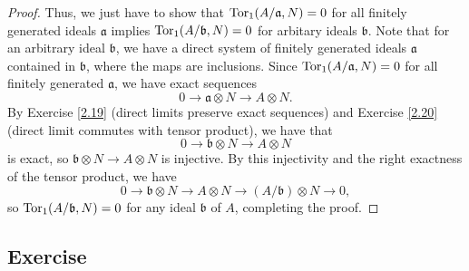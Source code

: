 \begin{proof}
Thus, we just have to show that $\operatorname{Tor}_1(A/\mathfrak{a},N) = 0$ for all finitely generated ideals $\mathfrak{a}$ implies $\operatorname{Tor}_1(A/\mathfrak{b},N) = 0$ for arbitary ideals $\mathfrak{b}$. Note that
for an arbitrary ideal $\mathfrak{b}$, we have a direct system of finitely generated ideals $\mathfrak{a}$ contained in $\mathfrak{b}$, where the maps are inclusions. Since $\operatorname{Tor}_1(A/\mathfrak{a},N) = 0$
for all finitely generated $\mathfrak{a}$, we have exact sequences
$$0 \to \mathfrak{a} \otimes N \to A \otimes N.$$
By Exercise \ref{2.19} (direct limits preserve exact sequences) and Exercise \ref{2.20} (direct limit commutes with tensor product), we have that
$$0 \to \mathfrak{b} \otimes N \to A \otimes N$$
is exact, so $\mathfrak{b} \otimes N \to A \otimes N$ is injective. By this injectivity and the right exactness of the tensor product, we have
$$0 \to \mathfrak{b} \otimes N \to A \otimes N \to (A/\mathfrak{b}) \otimes N \to 0,$$
so $\operatorname{Tor}_1(A/\mathfrak{b},N) = 0$ for any ideal $\mathfrak{b}$ of $A$, completing the proof.
\end{proof}

\subsection{Exercise}\label{2.27} %

